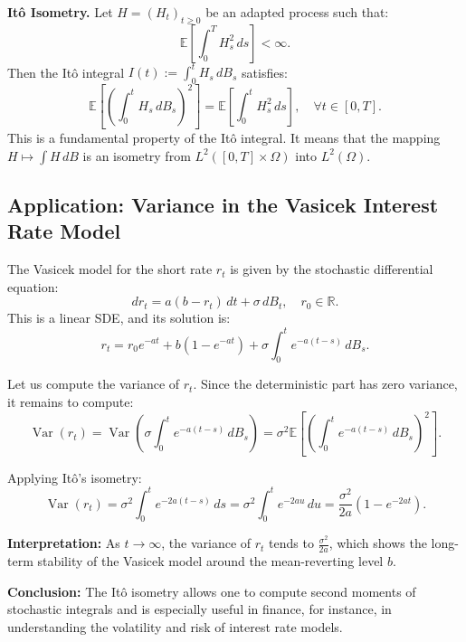 
\textbf{Itô Isometry.}  
Let \( H = (H_t)_{t \geq 0} \) be an adapted process such that:
\[
\mathbb{E} \left[ \int_0^T H_s^2 \, ds \right] < \infty.
\]
Then the Itô integral \( I(t) := \int_0^t H_s \, dB_s \) satisfies:
\[
\mathbb{E} \left[ \left( \int_0^t H_s \, dB_s \right)^2 \right] = \mathbb{E} \left[ \int_0^t H_s^2 \, ds \right], \quad \forall t \in [0, T].
\]
This is a fundamental property of the Itô integral. It means that the mapping \( H \mapsto \int H \, dB \) is an isometry from \( L^2([0,T] \times \Omega) \) into \( L^2(\Omega) \).

\vspace{1em}
\subsection{Application: Variance in the Vasicek Interest Rate Model}

The Vasicek model for the short rate \( r_t \) is given by the stochastic differential equation:
\[
dr_t = a(b - r_t) \, dt + \sigma \, dB_t, \quad r_0 \in \mathbb{R}.
\]
This is a linear SDE, and its solution is:
\[
r_t = r_0 e^{-at} + b(1 - e^{-at}) + \sigma \int_0^t e^{-a(t - s)} \, dB_s.
\]

Let us compute the variance of \( r_t \). Since the deterministic part has zero variance, it remains to compute:
\[
\operatorname{Var}(r_t) = \operatorname{Var} \left( \sigma \int_0^t e^{-a(t - s)} \, dB_s \right)
= \sigma^2 \mathbb{E} \left[ \left( \int_0^t e^{-a(t - s)} \, dB_s \right)^2 \right].
\]

Applying Itô's isometry:
\[
\operatorname{Var}(r_t) = \sigma^2 \int_0^t e^{-2a(t - s)} \, ds
= \sigma^2 \int_0^t e^{-2au} \, du
= \frac{\sigma^2}{2a} \left( 1 - e^{-2at} \right).
\]

\textbf{Interpretation:}  
As \( t \to \infty \), the variance of \( r_t \) tends to \( \frac{\sigma^2}{2a} \), which shows the long-term stability of the Vasicek model around the mean-reverting level \( b \).

\textbf{Conclusion:}  
The Itô isometry allows one to compute second moments of stochastic integrals and is especially useful in finance, for instance, in understanding the volatility and risk of interest rate models.